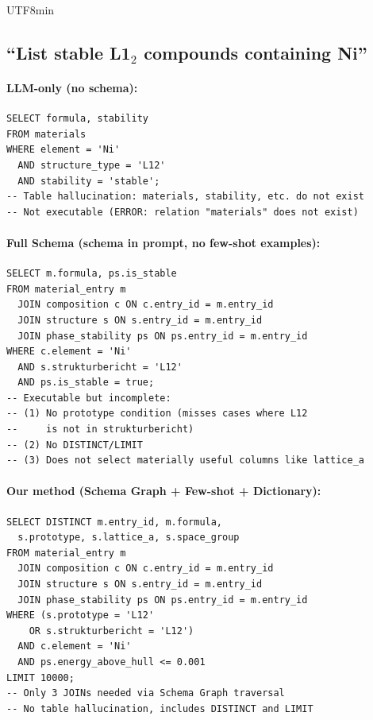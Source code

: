 \documentclass[sn-mathphys,Numbered]{sn-jnl}
\begin{document}
\begin{CJK}{UTF8}{min}
\subsection{``List stable L1$_2$ compounds containing Ni''}

\paragraph{LLM-only (no schema):}
\begin{lstlisting}[basicstyle=\ttfamily\scriptsize,breaklines=true]
SELECT formula, stability
FROM materials
WHERE element = 'Ni'
  AND structure_type = 'L12'
  AND stability = 'stable';
-- Table hallucination: materials, stability, etc. do not exist
-- Not executable (ERROR: relation "materials" does not exist)
\end{lstlisting}

\paragraph{Full Schema (schema in prompt, no few-shot examples):}
\begin{lstlisting}[basicstyle=\ttfamily\scriptsize,breaklines=true]
SELECT m.formula, ps.is_stable
FROM material_entry m
  JOIN composition c ON c.entry_id = m.entry_id
  JOIN structure s ON s.entry_id = m.entry_id
  JOIN phase_stability ps ON ps.entry_id = m.entry_id
WHERE c.element = 'Ni'
  AND s.strukturbericht = 'L12'
  AND ps.is_stable = true;
-- Executable but incomplete:
-- (1) No prototype condition (misses cases where L12
--     is not in strukturbericht)
-- (2) No DISTINCT/LIMIT
-- (3) Does not select materially useful columns like lattice_a
\end{lstlisting}

\paragraph{Our method (Schema Graph + Few-shot + Dictionary):}
\begin{lstlisting}[basicstyle=\ttfamily\scriptsize,breaklines=true]
SELECT DISTINCT m.entry_id, m.formula,
  s.prototype, s.lattice_a, s.space_group
FROM material_entry m
  JOIN composition c ON c.entry_id = m.entry_id
  JOIN structure s ON s.entry_id = m.entry_id
  JOIN phase_stability ps ON ps.entry_id = m.entry_id
WHERE (s.prototype = 'L12'
    OR s.strukturbericht = 'L12')
  AND c.element = 'Ni'
  AND ps.energy_above_hull <= 0.001
LIMIT 10000;
-- Only 3 JOINs needed via Schema Graph traversal
-- No table hallucination, includes DISTINCT and LIMIT
\end{lstlisting}


\end{CJK}
\end{document}
